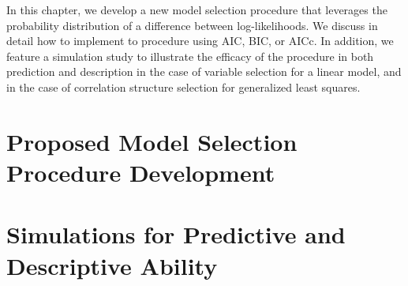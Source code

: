 \doublespace		
{}
		In this chapter, we develop a new model selection procedure that leverages the probability distribution of a difference between log-likelihoods. We discuss in detail how
		to implement to procedure using AIC, BIC, or AICc.  In addition, we feature a simulation study to illustrate the efficacy of the procedure in both prediction and description
		in the case of variable selection for a linear model, and in the case of correlation structure selection for generalized least squares.

		\section{Proposed Model Selection Procedure Development} \label{sec:proposed_method}
		
		\section{Simulations for Predictive and Descriptive Ability} \label{sec:sim_model_select}
		
